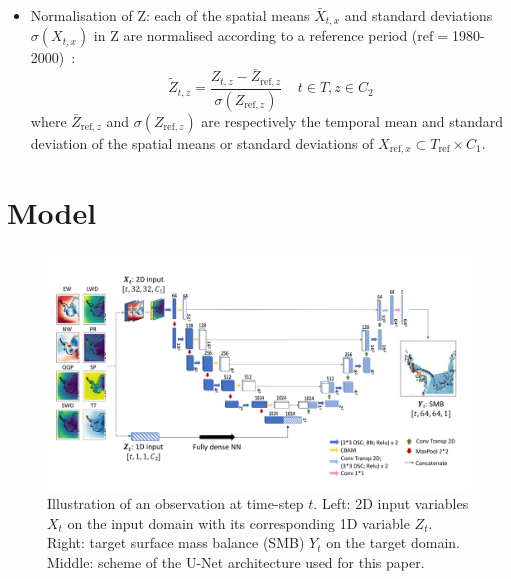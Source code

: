 \documentclass[a4paper,11pt,oneside]{report}
\begin{document}
\begin{itemize}
\item Normalisation of Z: each of the spatial means $\bar{X}_{t,x}$ and standard deviations $\sigma(X_{t,x})$ in Z are normalised according to a reference period ($\mathrm{ref}=$1980-2000)~\cite{Doury}:
\begin{equation}\label{eq:normalisation-Z}
    \tilde{Z}_{t,z} = \frac{Z_{t,z}-\bar{Z}_{\mathrm{\mathrm{ref}},z}}{\sigma(Z_{\mathrm{ref},z})} \;\;\;\; t\in T, z\in C_2
\end{equation}
where $\bar{Z}_{\mathrm{ref},z}$ and $\sigma(Z_{\mathrm{ref},z})$ are respectively the temporal mean and standard deviation of the spatial means or standard deviations of $X_{\mathrm{ref}, x} \subset T_{\mathrm{ref}}\times C_1$.
\end{itemize}




\section{Model}\label{sec:model}

\begin{figure}[!t]
  \centering
  \includegraphics[width=\columnwidth]{doc/Thesis-latex/images/unet-with-data.pdf}
  \caption []{\small Illustration of an observation at time-step $t$. Left: 2D input variables $X_t$ on the input domain with its corresponding 1D variable $Z_t$. Right: target surface mass balance (SMB) $Y_t$ on the target domain. Middle: scheme of the U-Net architecture used for this paper. }
  \vspace{-3mm}
  \label{fig:example-features}
\end{figure}
\end{document}
